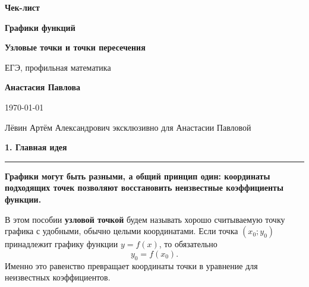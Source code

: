 \documentclass[a4paper,12pt]{article}
\newcommand{\topic}[1]{%
  \Needspace{7\baselineskip}%
  \vspace{0.45em}%
  {\Large\bfseries\color{darkaccent} #1}\par
  \vspace{0.2em}%
  {\color{accent}\rule{\linewidth}{0.7pt}}\par
  \vspace{0.35em}%
}
\newcommand{\keyidea}[1]{%
  \begin{center}
    \begin{minipage}{0.92\linewidth}
      \centering\color{darkaccent}\bfseries #1
    \end{minipage}
  \end{center}
}
\begin{document}
\begin{titlepage}
\thispagestyle{empty}
\centering

\vspace*{2.4cm}

{\Large\color{darkaccent}\bfseries Чек-лист\par}
\vspace{0.7cm}
{\Huge\bfseries Графики функций\par}
\vspace{0.25cm}
{\LARGE\bfseries Узловые точки и точки пересечения\par}

\vspace{1.5cm}
{\large ЕГЭ, профильная математика\par}

\vfill

{\large\bfseries Анастасия Павлова\par}
\vspace{0.35cm}
{\large \today\par}

\vspace{1.3cm}
{\normalsize Лёвин Артём Александрович эксклюзивно для Анастасии Павловой\par}

\vfill


\end{titlepage}

\topic{1. Главная идея}

\keyidea{Графики могут быть разными, а общий принцип один: координаты подходящих точек позволяют восстановить неизвестные коэффициенты функции.}

В этом пособии \textbf{узловой точкой} будем называть хорошо считываемую точку графика с удобными, обычно целыми координатами. Если точка $(x_0;y_0)$ принадлежит графику функции $y=f(x)$, то обязательно
\[
y_0=f(x_0).
\]
Именно это равенство превращает координаты точки в уравнение для неизвестных коэффициентов.
\end{document}
